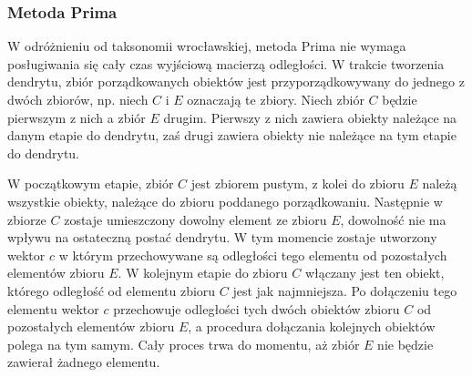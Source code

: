\documentclass[12pt,a4paper]{report}
\begin{document}



\subsubsection{Metoda Prima}


W odróżnieniu od taksonomii wrocławskiej, metoda Prima nie wymaga posługiwania się cały czas wyjściową macierzą odległości. W trakcie tworzenia dendrytu, zbiór porządkowanych obiektów jest przyporządkowywany do jednego z dwóch zbiorów, np. niech $C$ i $E$ oznaczają te zbiory. Niech zbiór $C$ będzie pierwszym z nich a zbiór $E$ drugim. Pierwszy z nich zawiera obiekty należące na danym etapie do dendrytu, zaś drugi zawiera obiekty nie należące na tym etapie do dendrytu.

W początkowym etapie, zbiór $C$ jest zbiorem pustym, z kolei do zbioru $E$ należą wszystkie obiekty, należące do zbioru poddanego porządkowaniu. Następnie w zbiorze $C$ zostaje umieszczony dowolny element ze zbioru $E$, dowolność nie ma wpływu na ostateczną postać dendrytu. W tym momencie zostaje utworzony wektor $c$ w którym przechowywane są odległości tego elementu od pozostałych elementów zbioru $E$. W kolejnym etapie do zbioru $C$ włączany jest ten obiekt, którego odległość od elementu  zbioru $C$ jest jak najmniejsza. Po dołączeniu tego elementu wektor $c$ przechowuje odległości tych dwóch obiektów zbioru $C$ od pozostałych elementów zbioru $E$, a procedura dołączania kolejnych obiektów polega na tym samym. Cały proces trwa do momentu, aż zbiór $E$ nie będzie zawierał żadnego elementu. 
\end{document}
